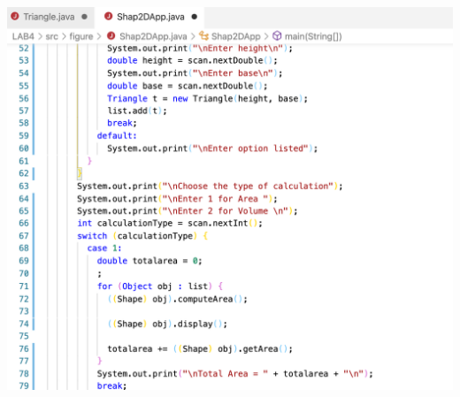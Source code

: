 \documentclass[hidelinks,12pt]{article}
\begin{document}
    \includegraphics[scale=0.4]{z_shape2dapp3.png}
    
\end{document}
